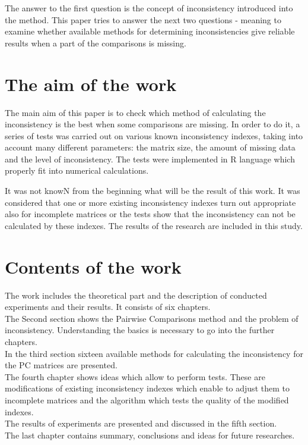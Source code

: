 The answer to the first question is the concept of inconsistency introduced into the method. This paper tries to answer the next two questions - meaning to examine whether available methods for determining inconsistencies give reliable results when a part of the comparisons is missing. 

\section{The aim of the work}
\label{sec:celePracy}
The main aim of this paper is to check which method of calculating the inconsistency is the best when some comparisons are missing. In order to do it, a series of tests was carried out on various known inconsistency indexes, taking into account many different parameters: the matrix size, the amount of missing data and the level of inconsistency.
The tests were implemented in R language which properly fit into numerical calculations.

It was not knowN from the beginning what will be the result of this work. It was considered that one or more existing inconsistency indexes turn out appropriate also for incomplete matrices or the tests show that the inconsistency can not be calculated by these indexes. 
The results of the research are included in this study.

\section{Contents of the work}
\label{sec:zawartoscPracy}
The work includes the theoretical part and the description of conducted experiments and their results. It consists of six chapters.\\
The Second section shows the Pairwise Comparisons method and the problem of inconsistency. Understanding the basics is necessary to go into the further chapters.\\
In the third section sixteen available methods for calculating the inconsistency for the PC matrices are presented. \\
The fourth chapter shows ideas which allow to perform tests. These are modifications of existing inconsistency indexes which enable to adjust them to incomplete matrices and the algorithm which tests the quality of the modified indexes. \\
The results of experiments are presented and discussed in the fifth section.\\
The last chapter contains summary, conclusions and ideas for future researches.